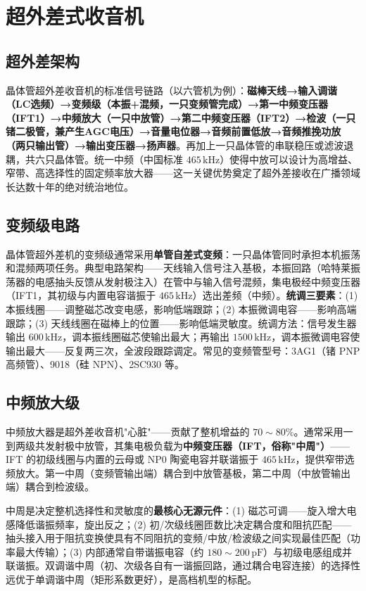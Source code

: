 \documentclass[12pt,UTF8]{ctexbook}
\begin{document}
\section{超外差式收音机}
\label{sec:transistor_superheterodyne}

\subsection{超外差架构}

晶体管超外差收音机的标准信号链路（以六管机为例）：\textbf{磁棒天线→输入调谐（LC选频）→变频级（本振+混频，一只变频管完成）→第一中频变压器（IFT1）→中频放大（一只中放管）→第二中频变压器（IFT2）→检波（一只锗二极管，兼产生AGC电压）→音量电位器→音频前置低放→音频推挽功放（两只输出管）→输出变压器→扬声器}。再加上一只晶体管的串联稳压或滤波退耦，共六只晶体管。统一中频（中国标准 $465\,\mathrm{kHz}$）使得中放可以设计为高增益、窄带、高选择性的固定频率放大器——这一关键优势奠定了超外差接收在广播领域长达数十年的绝对统治地位。

\subsection{变频级电路}

晶体管超外差机的变频级通常采用\textbf{单管自差式变频}：一只晶体管同时承担本机振荡和混频两项任务。典型电路架构——天线输入信号注入基极，本振回路（哈特莱振荡器的电感抽头反馈从发射极注入）在管中与输入信号混频，集电极经中频变压器（IFT1，其初级与内置电容谐振于 $465\,\mathrm{kHz}$）选出差频（中频）。\textbf{统调三要素}：(1) 本振线圈——调整磁芯改变电感，影响低端跟踪；(2) 本振微调电容——影响高端跟踪；(3) 天线线圈在磁棒上的位置——影响低端灵敏度。统调方法：信号发生器输出 $600\,\mathrm{kHz}$，调本振线圈磁芯使输出最大；再输出 $1500\,\mathrm{kHz}$，调本振微调电容使输出最大——反复两三次，全波段跟踪调定。常见的变频管型号：3AG1（锗 PNP 高频管）、9018（硅 NPN）、2SC930 等。

\subsection{中频放大级}

中频放大器是超外差收音机"心脏"——贡献了整机增益的 $70\sim80\%$。通常采用一到两级共发射极中放管，其集电极负载为\textbf{中频变压器（IFT，俗称"中周"）}——IFT 的初级线圈与内置的云母或 NP0 陶瓷电容并联谐振于 $465\,\mathrm{kHz}$，提供窄带选频放大。第一中周（变频管输出端）耦合到中放管基极，第二中周（中放管输出端）耦合到检波级。

中周是决定整机选择性和灵敏度的\textbf{最核心无源元件}：(1) 磁芯可调——旋入增大电感降低谐振频率，旋出反之；(2) 初/次级线圈匝数比决定耦合度和阻抗匹配——抽头接入用于阻抗变换使具有不同阻抗的变频/中放/检波级之间实现最佳匹配（功率最大传输）；(3) 内部通常自带谐振电容（约 $180\sim200\,\mathrm{pF}$）与初级电感组成并联谐振。双调谐中周（初、次级各自有一谐振回路，通过耦合电容连接）的选择性远优于单调谐中周（矩形系数更好），是高档机型的标配。
\end{document}
